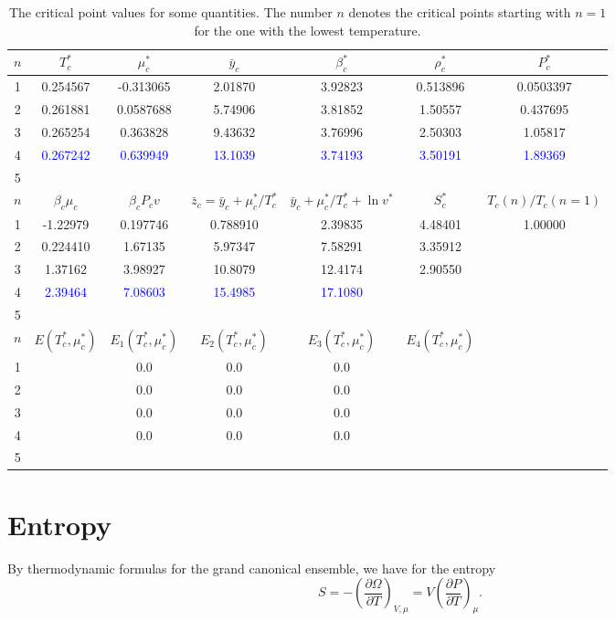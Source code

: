 \documentclass[12pt]{article}
\numberwithin{equation}{section}
\begin{document}
	\begin{table}[h]
		\centering
		\caption{The critical point values for some quantities. The number $n$ denotes the critical points starting with $n=1$ for the one with the lowest temperature.}
		\begin{tabular}{|c|c|c|c|c|c|c|}
			\hline
			$n$ & $T^*_c$ & $\mu^*_c$ & $\bar{y}_c$ & $\beta^*_c$ & $\rho^*_c$ & $P^*_c$ \\
			\hline
			1 & 0.254567 & -0.313065 & 2.01870 & 3.92823 & 0.513896 & 0.0503397  \\
			2 & 0.261881 & 0.0587688 & 5.74906 & 3.81852 & 1.50557 & 0.437695  \\
			3 & 0.265254 & 0.363828 & 9.43632 & 3.76996 & 2.50303 & 1.05817 \\
			4 & \textcolor{blue}{0.267242} & \textcolor{blue}{0.639949} & \textcolor{blue}{13.1039} & \textcolor{blue}{3.74193} & \textcolor{blue}{3.50191} & \textcolor{blue}{1.89369} \\
			5 & & & & & & \\
			\hline
			$n$ & $\beta_c\mu_c$ & $\beta_c P_c v$ & $\bar{z}_c=\bar{y}_c+\mu^*_c/T^*_c$ & $\bar{y}_c+\mu^*_c/T^*_c + \ln v^*$ & $S^*_c$ & $T_c(n)/T_c(n=1)$ \\
			\hline
			1 & -1.22979 & 0.197746 & 0.788910 & 2.39835 & 4.48401 & 1.00000 \\
			2 & 0.224410 & 1.67135 & 5.97347 & 7.58291 & 3.35912 & \\
			3 & 1.37162 & 3.98927 & 10.8079 & 12.4174 & 2.90550 & \\
			4 & \textcolor{blue}{2.39464}  & \textcolor{blue}{7.08603}& \textcolor{blue}{15.4985} & \textcolor{blue}{17.1080} & & \\
			5 &  & & & & & \\
			\hline
			$n$ & $E(T^*_c,\mu^*_c)$ & $E_1(T^*_c,\mu^*_c)$ & $E_2(T^*_c,\mu^*_c)$ & $E_3(T^*_c,\mu^*_c)$ & $E_4(T^*_c,\mu^*_c)$ &  \\
			\hline
			1 & & 0.0 & 0.0 & 0.0 & & \\
			2 & & 0.0 & 0.0 & 0.0 & & \\
			3 & & 0.0 & 0.0 & 0.0 & & \\
			4 & & 0.0 & 0.0 & 0.0 & & \\
			5 & & & & & & \\
			\hline
		\end{tabular}
		\label{tab:cp}
	\end{table}
	
	\pagebreak
	\section{Entropy}
	By thermodynamic formulas for the grand canonical ensemble, we have for the entropy
	\begin{equation}
		S = -\left(\frac{\partial \Omega}{\partial T}\right)_{V,\mu} = V\left(\frac{\partial P}{\partial T}\right)_{\mu}.
	\end{equation} 
	
\end{document}
